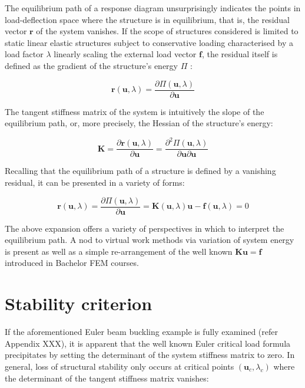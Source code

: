 The equilibrium path of a response diagram unsurprisingly indicates the points in load-deflection space where the structure is in equilibrium, that is, the residual vector $\mathbf{r}$ of the system vanishes. If the scope of structures considered is limited to static linear elastic structures subject to conservative loading characterised by a load factor $\lambda$ linearly scaling the external load vector $\mathbf{f}$, the residual itself is defined as the gradient of the structure's energy $\Pi$ \cite{FelippaNFEMCrit2016}:

\begin{equation}
\mathbf{r}(\mathbf{u},\lambda) = \frac{\partial \Pi (\mathbf{u},\lambda)}{\partial \mathbf{u}}
\label{eqstab0}
\end{equation}

The tangent stiffness matrix of the system is intuitively the slope of the equilibrium path, or, more precisely, the Hessian of the structure's energy:

\begin{equation} 
\mathbf{K} = 
\frac{\partial \mathbf{r} (\mathbf{u},\lambda)}{\partial \mathbf{u}} = 
\frac{\partial^2 \Pi (\mathbf{u},\lambda)}{\partial \mathbf{u}\partial \mathbf{u}}
\label{eqstab01}
\end{equation}

Recalling that the equilibrium path of a structure is defined by a vanishing residual, it can be presented in a variety of forms:

\begin{equation} 
\mathbf{r}(\mathbf{u},\lambda) = 
\frac{\partial \Pi (\mathbf{u},\lambda)}{\partial \mathbf{u}} =
\mathbf{K}(\mathbf{u},\lambda) \mathbf{u} - \mathbf{f}(\mathbf{u},\lambda) =
0
\label{eqstab02}
\end{equation}

The above expansion offers a variety of perspectives in which to interpret the equilibrium path. A nod to virtual work methods via variation of system energy is present as well as a simple re-arrangement of the well known $\mathbf{Ku} = \mathbf{f}$ introduced in Bachelor FEM courses.

\section{Stability criterion}
 If the aforementioned Euler beam buckling example is fully examined (refer Appendix XXX), it is apparent that the well known Euler critical load formula precipitates by setting the determinant of the system stiffness matrix to zero. In general, loss of structural stability only occurs at critical points $(\mathbf{u}_c,\lambda_c)$ where the determinant of the tangent stiffness matrix vanishes:
 
